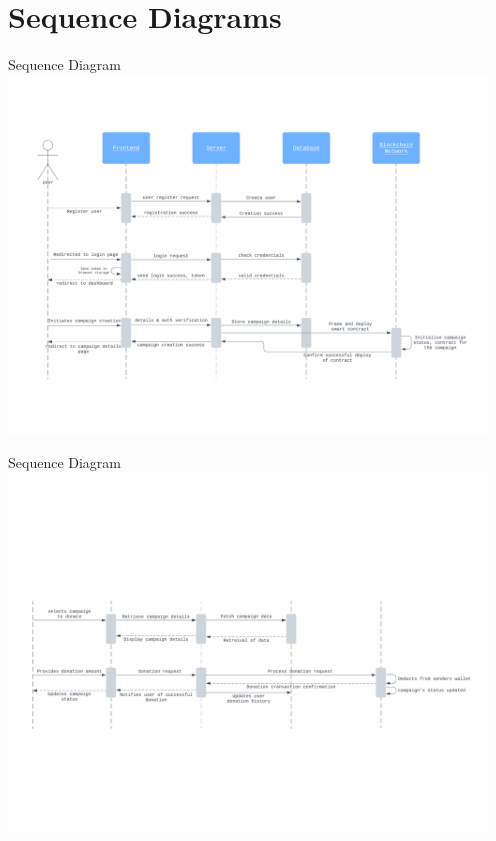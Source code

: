 \documentclass{beamer}
\begin{document}
\section{Sequence Diagrams}
\begin{frame}{Sequence Diagram}
    \hspace*{-1cm}
    \includegraphics[width=360pt]{assets/seqdiags/seq1.png} 
\end{frame}
\begin{frame}{Sequence Diagram}
    \hspace*{-1cm}
    \includegraphics[width=360pt]{assets/seqdiags/seq2.png} 
\end{frame}
    
\end{document}
